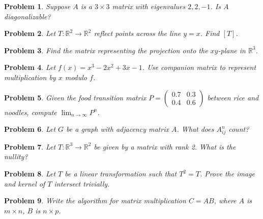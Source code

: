 \documentclass[11pt]{article}
\theoremstyle{upright}
\newtheorem{problem}{Problem}
\begin{document}
\begin{problem}
Suppose $A$ is a $3 \times 3$ matrix with eigenvalues $2, 2, -1$. Is $A$ diagonalizable?
\end{problem}

\begin{problem}
Let $T:\mathbb{R}^2 \to \mathbb{R}^2$ reflect points across the line $y = x$. Find $[T]$.
\end{problem}

\begin{problem}
Find the matrix representing the projection onto the $xy$-plane in $\mathbb{R}^3$.
\end{problem}

\begin{problem}
Let $f(x) = x^3 - 2x^2 + 3x - 1$. Use companion matrix to represent multiplication by $x$ modulo $f$.
\end{problem}

\begin{problem}
Given the food transition matrix $P = \begin{pmatrix}0.7 & 0.3\\0.4 & 0.6\end{pmatrix}$ between rice and noodles, compute $\lim_{n\to\infty}P^n$.
\end{problem}

\begin{problem}
Let $G$ be a graph with adjacency matrix $A$. What does $A^n_{ij}$ count?
\end{problem}

\begin{problem}
Let $T:\mathbb{R}^3 \to \mathbb{R}^2$ be given by a matrix with rank 2. What is the nullity?
\end{problem}

\begin{problem}
Let $T$ be a linear transformation such that $T^2 = T$. Prove the image and kernel of $T$ intersect trivially.
\end{problem}

\begin{problem}
Write the algorithm for matrix multiplication $C = AB$, where $A$ is $m \times n$, $B$ is $n \times p$.
\end{problem}
\end{document}
